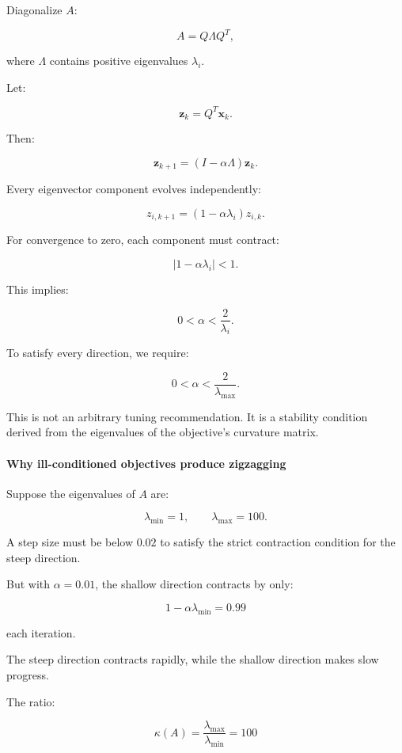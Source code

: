 Diagonalize \(A\):

\[
A=Q\Lambda Q^T,
\]

where \(\Lambda\) contains positive eigenvalues \(\lambda_i\).

Let:

\[
\mathbf z_k=Q^T\mathbf x_k.
\]

Then:

\[
\mathbf z_{k+1} = (I-\alpha\Lambda)\mathbf z_k.
\]

Every eigenvector component evolves independently:

\[
\boxed{ z_{i,k+1}=(1-\alpha\lambda_i)z_{i,k} }.
\]

For convergence to zero, each component must contract:

\[
|1-\alpha\lambda_i|<1.
\]

This implies:

\[
0<\alpha<\frac2{\lambda_i}.
\]

To satisfy every direction, we require:

\[
\boxed{ 0<\alpha<\frac2{\lambda_{\max}} }.
\]

This is not an arbitrary tuning recommendation. It is a stability condition derived from the eigenvalues of the objective's curvature matrix.

\paragraph{Why ill-conditioned objectives produce zigzagging}\label{02-foundations-ii-ch026-why-ill-conditioned-objectives-produce-zigzagging}

\hypertarget{02-foundations-ii-ch026-why-ill-conditioned-objectives-produce-zigzagging}{}

Suppose the eigenvalues of \(A\) are:

\[
\lambda_{\min}=1, \qquad \lambda_{\max}=100.
\]

A step size must be below \(0.02\) to satisfy the strict contraction condition for the steep direction.

But with \(\alpha=0.01\), the shallow direction contracts by only:

\[
1-\alpha\lambda_{\min}=0.99
\]

each iteration.

The steep direction contracts rapidly, while the shallow direction makes slow progress.

The ratio:

\[
\boxed{\kappa(A)=\frac{\lambda_{\max}}{\lambda_{\min}}=100}
\]

